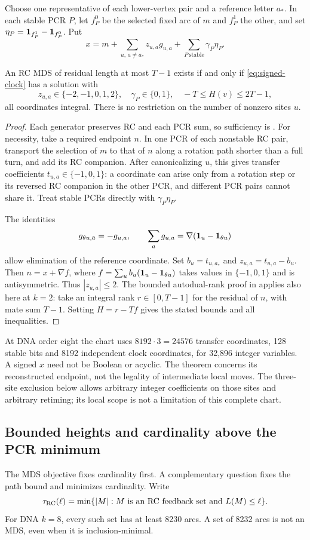 Choose one representative of each lower-vertex pair and a reference
letter $a_*$. In each stable PCR $P$, let $f_P^0$ be the selected
fixed arc of $m$ and $f_P^1$ the other, and set
$\eta_P=\mathbf 1_{f_P^1}-\mathbf 1_{f_P^0}$. Put
\[
 x=m+\sum_{u,\,a\ne a_*}z_{u,a}g_{u,a}
                         +\sum_{P\ \mathrm{stable}}\gamma_P\eta_P.
\]
\begin{theorem}
\label{thm:bounded-chart}
An RC MDS of residual length at most $T-1$ exists if and only if
\eqref{eq:signed-clock} has a solution with
\[
 z_{u,a}\in\{-2,-1,0,1,2\},\quad \gamma_P\in\{0,1\},\quad
 -T\le H(v)\le2T-1,
\]
all coordinates integral. There is no restriction on the number
of nonzero sites $u$.
\end{theorem}
\begin{proof}
Each generator preserves RC and each PCR sum, so sufficiency is
. For necessity, take a required
endpoint $n$. In one PCR of each nonstable RC pair, transport the
selection of $m$ to that of $n$ along a rotation path shorter than
a full turn, and add its RC companion. After canonicalizing $u$,
this gives transfer coefficients $t_{u,a}\in\{-1,0,1\}$: a
coordinate can arise only from a rotation step or its reversed RC
companion in the other PCR, and different PCR pairs cannot share it.
Treat stable PCRs directly with $\gamma_P\eta_P$.

The identities
\[
 g_{\theta u,\bar a}=-g_{u,a},\qquad
 \sum_a g_{u,a}=\nabla(\mathbf 1_u-\mathbf 1_{\theta u})
\]
allow elimination of the reference coordinate. Set $b_u=t_{u,a_*}$
and $z_{u,a}=t_{u,a}-b_u$. Then $n=x+\nabla f$, where
$f=\sum_u b_u(\mathbf 1_u-\mathbf 1_{\theta u})$ takes values in
$\{-1,0,1\}$ and is antisymmetric. Thus $|z_{u,a}|\le2$.
The bounded autodual-rank proof in  applies
also here at $k=2$: take an integral rank $r\in[0,T-1]$ for the
residual of $n$, with mate sum $T-1$. Setting $H=r-Tf$ gives the
stated bounds and all inequalities.
\end{proof}
At DNA order eight the chart uses $8192\cdot3=24576$ transfer
coordinates, 128 stable bits and 8192 independent clock coordinates,
for 32,896 integer variables. A signed $x$ need not be Boolean or
acyclic. The theorem concerns its reconstructed endpoint, not the
legality of intermediate local moves. The three-site exclusion below
allows arbitrary integer coefficients on those sites and arbitrary
retiming; its local scope is not a limitation of this complete chart.

\subsection{Bounded heights and cardinality above the PCR minimum}
\label{sec:height-excess}
The MDS objective fixes cardinality first. A complementary question fixes
the path bound and minimizes cardinality. Write
\[
 \tau_{\operatorname{RC}}(\ell)=\min\{|M|:M\text{ is an RC feedback set and }L(M)\le\ell\}.
\]
For DNA $k=8$, every such set has at least 8230 arcs. A set of
8232 arcs is not an MDS, even when it is inclusion-minimal.

